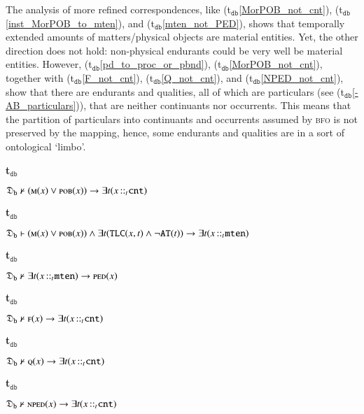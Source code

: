 \documentclass[ao]{iosart2x}
\newcommand{\bflist}{\begin{list}{}{\setlength{\topsep}{2mm}\setlength{\parsep}{0mm}\setlength{\leftmargin}{9.2mm}\setlength{\labelwidth}{8mm}}}
\newcommand{\eflist}{\end{list}}
\newcommand{\dbThrLabel}{\textrm{t$_\texttt{db}$}}
\newcounter{cntdbth}
\newcommand{\dbth}[1]{\refstepcounter{cntdbth}\begin{small}{\bf \dbThrLabel\thecntdbth\label{#1}}\end{small}}
\newcommand{\refdbth}[1]{({\dbThrLabel}\ref{#1})}
\newcommand{\pr}[1]{\mathtt{#1}}
\newcommand{\cn}[1]{\mathtt{#1}}
\newcommand{\bfo}{{\textsc{bfo}}}
\newcommand {\thdolcedbmap} {\ensuremath{\mathfrak{D}_\texttt{b}}}
\newcommand {\Mdcat} {\textsc{m}}
\newcommand {\Fdcat} {\textsc{f}}
\newcommand {\NPEDdcat} {\textsc{nped}}
\newcommand {\PEDdcat} {\textsc{ped}}
\newcommand {\POBdcat} {\textsc{pob}}
\newcommand {\Qdcat} {\textsc{q}}
\newcommand {\ATd} {\ensuremath{\pr{AT}}}
\newcommand {\TLCd} {\ensuremath{\pr{TLC}}}
\newcommand{\cntbcat}{\cn{cnt}}
\newcommand{\mtenbcat}{\cn{mten}}
\newcommand{\bfoiof}[1]{{\,::_{#1\:\!}}}
\begin{document}
The analysis of more refined correspondences, like \refdbth{MorPOB_not_cnt}, \refdbth{inst_MorPOB_to_mten}, and \refdbth{mten_not_PED}, shows that temporally extended amounts of matters/physical objects are material entities. Yet, the other direction does not hold: non-physical endurants could be very well be material entities. However,  \refdbth{pd_to_proc_or_pbnd}, \refdbth{MorPOB_not_cnt}, together with \refdbth{F_not_cnt}, \refdbth{Q_not_cnt}, and \refdbth{NPED_not_cnt}, show that there are endurants and qualities, all of which are particulars (see \refdbth{-AB_particulars}), that are neither continuants nor occurrents. This means that the partition of particulars into continuants and occurrents assumed by {\bfo} is not preserved by the mapping, hence, some endurants and qualities  are in a sort of ontological `limbo'. 
%
\bflist
\item[\dbth{MorPOB_not_cnt}] $\thdolcedbmap \nvdash (\Mdcat(x) \lor \POBdcat(x)) \to \exists t(x \bfoiof{t} \cntbcat)$

\item[\dbth{inst_MorPOB_to_mten}] $\thdolcedbmap \vdash (\Mdcat(x) \lor \POBdcat(x)) \land \exists t(\TLCd(x,t) \land \neg \ATd(t)) \to \exists t(x \bfoiof{t} \mtenbcat)$

\item[\dbth{mten_not_PED}] $\thdolcedbmap \nvdash \exists t(x \bfoiof{t} \mtenbcat) \to \PEDdcat(x)$

\item[\dbth{F_not_cnt}] $\thdolcedbmap \nvdash \Fdcat(x) \to \exists t(x \bfoiof{t} \cntbcat)$

\item[\dbth{Q_not_cnt}] $\thdolcedbmap \nvdash \Qdcat(x) \to \exists t(x \bfoiof{t} \cntbcat)$

\item[\dbth{NPED_not_cnt}] $\thdolcedbmap \nvdash \NPEDdcat(x) \to \exists t(x \bfoiof{t} \cntbcat)$
\eflist
\end{document}

